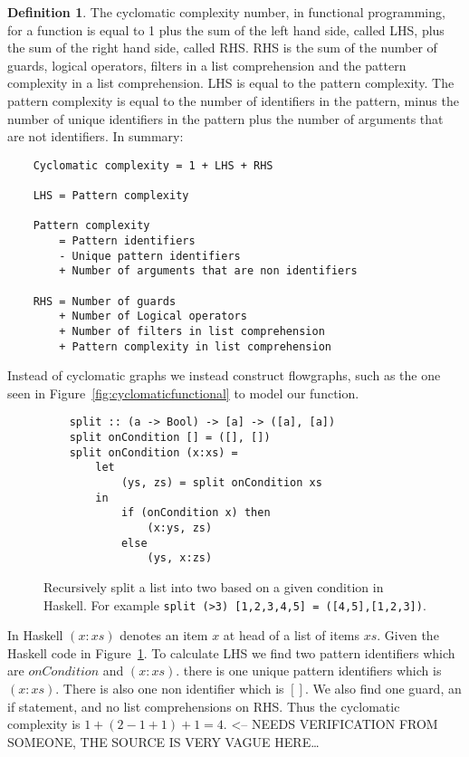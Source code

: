 \documentclass[12pt]{article}
\theoremstyle{definition}
\newtheorem*{definition}{Definition}
\theoremstyle{theorem}
\begin{document}
\theoremstyle{definition}
\begin{definition}
    The cyclomatic complexity number, in functional programming, for a function
    is equal to 1 plus the sum of the left hand side, called LHS, plus the sum
    of the right hand side, called RHS. RHS is the sum of the number of guards,
    logical operators, filters in a list comprehension and the pattern
    complexity in a list comprehension. LHS is equal to the pattern complexity.
    The pattern complexity is equal to the number of identifiers in the pattern,
    minus the number of unique identifiers in the pattern plus the number of
    arguments that are not identifiers. In summary:

    \begin{lstlisting}
    Cyclomatic complexity = 1 + LHS + RHS

    LHS = Pattern complexity 

    Pattern complexity   
        = Pattern identifiers 
        - Unique pattern identifiers 
        + Number of arguments that are non identifiers

    RHS = Number of guards 
        + Number of Logical operators 
        + Number of filters in list comprehension 
        + Pattern complexity in list comprehension
    \end{lstlisting}
\end{definition}

Instead of cyclomatic graphs we instead construct flowgraphs, such as the one
seen in Figure~\ref{fig:cyclomaticfunctional} to model our function.

\begin{figure}[H]
    \begin{lstlisting}
    split :: (a -> Bool) -> [a] -> ([a], [a])
    split onCondition [] = ([], [])
    split onCondition (x:xs) =
        let 
            (ys, zs) = split onCondition xs
        in 
            if (onCondition x) then 
                (x:ys, zs)
            else 
                (ys, x:zs)
    \end{lstlisting}
    \caption{Recursively split a list into two based on a given condition in
    Haskell. For example \texttt{split (>3) [1,2,3,4,5] =
    ([4,5],[1,2,3])}.}\label{fig:split}
\end{figure}

In Haskell $(x:xs)$ denotes an item $x$ at head of a list of items $xs$. Given
the Haskell code in Figure~\ref{fig:split}. To calculate LHS we find two
pattern identifiers which are $onCondition$ and $(x:xs)$. there is one unique
pattern identifiers which is $(x:xs)$. There is also one non identifier
which is $[]$. We also find one guard, an if statement, and no
list comprehensions on RHS. Thus the cyclomatic complexity is $1+(2-1+1)+1=4$.
<-- NEEDS VERIFICATION FROM SOMEONE, THE SOURCE IS VERY VAGUE HERE\ldots
\end{document}
